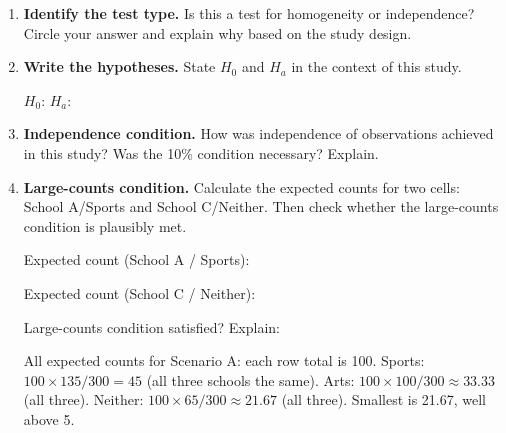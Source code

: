 \documentclass[10pt]{article}
\begin{document}
\begin{enumerate}[label=\textbf{A\arabic*.}]

    \item \textbf{Identify the test type.} Is this a test for homogeneity or independence?
          Circle your answer and explain why based on the study design.


    \item \textbf{Write the hypotheses.} State $H_0$ and $H_a$ in the context of this study.

          $H_0$: 
          $H_a$: 

    \item \textbf{Independence condition.} How was independence of observations achieved
          in this study? Was the 10\% condition necessary? Explain.


    \item \textbf{Large-counts condition.} Calculate the expected counts for two cells:
          School A/Sports and School C/Neither. Then check whether the large-counts
          condition is plausibly met.

          Expected count (School A / Sports): 

          Expected count (School C / Neither): 

          Large-counts condition satisfied?  \quad Explain: 

          \begin{teachernote}
              All expected counts for Scenario A: each row total is 100.
              Sports: $100 \times 135/300 = 45$ (all three schools the same).
              Arts: $100 \times 100/300 \approx 33.33$ (all three).
              Neither: $100 \times 65/300 \approx 21.67$ (all three).
              Smallest is 21.67, well above 5.
          \end{teachernote}

\end{enumerate}
\end{document}
